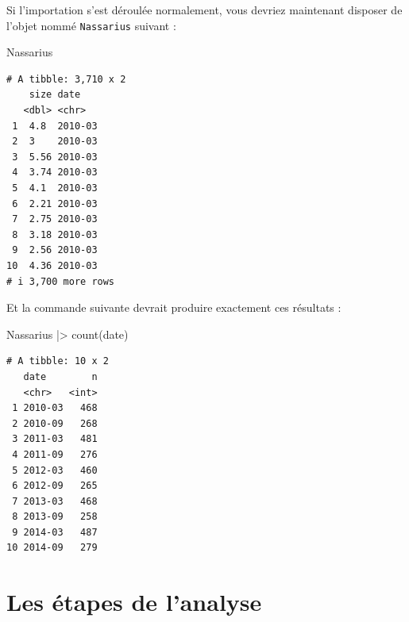 \documentclass[
  french,
  a4paper,
  DIV=11,
  numbers=noendperiod,
  oneside]{scrreprt}
\newenvironment{Shaded}{}{}
\newcommand{\FunctionTok}[1]{\textcolor[rgb]{0.44,0.26,0.76}{#1}}
\newcommand{\NormalTok}[1]{\textcolor[rgb]{0.14,0.16,0.18}{#1}}
\newcommand{\SpecialCharTok}[1]{\textcolor[rgb]{0.00,0.36,0.77}{#1}}
\begin{document}
\begin{tcolorbox}
Si l'importation s'est déroulée normalement, vous devriez maintenant
disposer de l'objet nommé \texttt{Nassarius} suivant :

\begin{Shaded}
\begin{Highlighting}[]
\NormalTok{Nassarius}
\end{Highlighting}
\end{Shaded}

\begin{verbatim}
# A tibble: 3,710 x 2
    size date   
   <dbl> <chr>  
 1  4.8  2010-03
 2  3    2010-03
 3  5.56 2010-03
 4  3.74 2010-03
 5  4.1  2010-03
 6  2.21 2010-03
 7  2.75 2010-03
 8  3.18 2010-03
 9  2.56 2010-03
10  4.36 2010-03
# i 3,700 more rows
\end{verbatim}

Et la commande suivante devrait produire exactement ces résultats :

\begin{Shaded}
\begin{Highlighting}[]
\NormalTok{Nassarius }\SpecialCharTok{|\textgreater{}}
  \FunctionTok{count}\NormalTok{(date)}
\end{Highlighting}
\end{Shaded}

\begin{verbatim}
# A tibble: 10 x 2
   date        n
   <chr>   <int>
 1 2010-03   468
 2 2010-09   268
 3 2011-03   481
 4 2011-09   276
 5 2012-03   460
 6 2012-09   265
 7 2013-03   468
 8 2013-09   258
 9 2014-03   487
10 2014-09   279
\end{verbatim}


\section{Les étapes de l'analyse}\label{les-uxe9tapes-de-lanalyse}


\end{tcolorbox}
\end{document}
